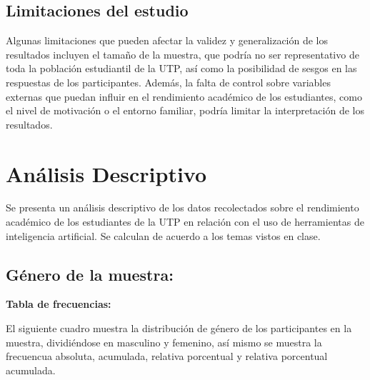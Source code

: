 \documentclass{article}
\newenvironment{metodologia}{}{}
\newenvironment{analisisDescriptivo}{}{}
\begin{document}
\begin{metodologia}
  \subsection{Limitaciones del estudio}

  Algunas limitaciones que pueden afectar la validez y generalización de los resultados incluyen el tamaño de la muestra, que podría no ser representativo de toda la población estudiantil de la UTP, así como la posibilidad de sesgos en las respuestas de los participantes. Además, la falta de control sobre variables externas que puedan influir en el rendimiento académico de los estudiantes, como el nivel de motivación o el entorno familiar, podría limitar la interpretación de los resultados.
\end{metodologia}

\newpage

\begin{analisisDescriptivo}

  \section{Análisis Descriptivo}

  Se presenta un análisis descriptivo de los datos recolectados sobre el rendimiento académico de los estudiantes de la UTP en relación con el uso de herramientas de inteligencia artificial. Se calculan de acuerdo a los temas vistos en clase.
  
\end{analisisDescriptivo}

\vspace{-0.5cm}
\subsection{Género de la muestra:}
  
  \textbf{Tabla de frecuencias:}

  El siguiente cuadro muestra la distribución de género de los participantes en la muestra, dividiéndose en masculino y femenino, así mismo se muestra la frecuencua absoluta, acumulada, relativa porcentual y relativa porcentual acumulada.
\end{document}
